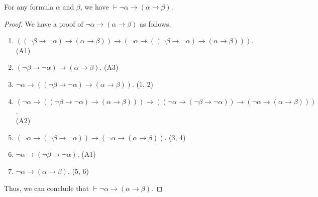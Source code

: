 \begin{theorem}
  \label{thm:contradiction}
  For any formula $\alpha$ and $\beta$, we have
  $\vdash \neg\alpha \to (\alpha \to \beta)$.
\end{theorem}
\begin{proof}
  We have a proof of $\neg\alpha \to (\alpha \to \beta)$ as follows.
  \begin{enumerate}[(1)]
    \item $((\neg\beta \to \neg\alpha) \to (\alpha \to \beta))
    \to (\neg\alpha \to ((\neg\beta \to \neg\alpha) \to (\alpha \to \beta)))$.
    \hfill (A1)
    \item $(\neg\beta \to \neg\alpha) \to (\alpha \to \beta)$. \hfill (A3)
    \item $\neg\alpha \to ((\neg\beta \to \neg\alpha) \to (\alpha \to \beta))$.
    \hfill (1, 2)
    \item $(\neg\alpha \to ((\neg\beta \to \neg\alpha) \to (\alpha \to \beta)))
    \to ((\neg\alpha \to (\neg\beta \to \neg\alpha))
    \to (\neg\alpha \to (\alpha \to \beta)))$. \\ \hbox{} \hfill (A2)
    \item $(\neg\alpha \to (\neg\beta \to \neg\alpha))
    \to (\neg\alpha \to (\alpha \to \beta))$. \hfill (3, 4)
    \item $\neg\alpha \to (\neg\beta \to \neg\alpha)$. \hfill (A1)
    \item $\neg\alpha \to (\alpha \to \beta)$. \hfill (5, 6)
  \end{enumerate}
  Thus, we can conclude that $\vdash \neg\alpha \to (\alpha \to \beta)$.
\end{proof}

